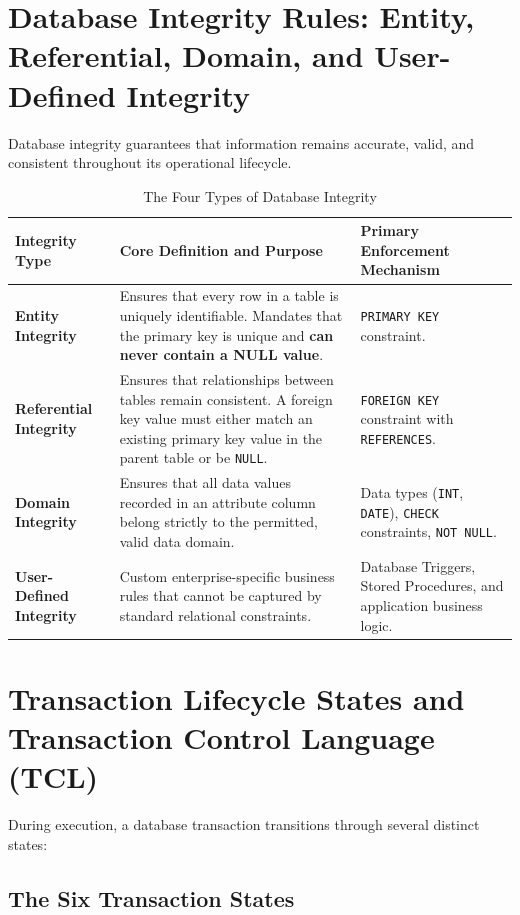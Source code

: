 \newpage
\section{Database Integrity Rules: Entity, Referential, Domain, and User-Defined Integrity}

Database integrity guarantees that information remains accurate, valid, and consistent throughout its operational lifecycle.

\begin{table}[htbp]
\centering
\caption{The Four Types of Database Integrity}
\label{tab:database_integrity_types}
\begin{tabularx}{\textwidth}{p{3.2cm} X X}
\toprule
\textbf{Integrity Type} & \textbf{Core Definition and Purpose} & \textbf{Primary Enforcement Mechanism} \\
\midrule
\textbf{Entity Integrity} & Ensures that every row in a table is uniquely identifiable. Mandates that the primary key is unique and \textbf{can never contain a NULL value}. & \texttt{PRIMARY KEY} constraint. \\
\textbf{Referential Integrity} & Ensures that relationships between tables remain consistent. A foreign key value must either match an existing primary key value in the parent table or be \texttt{NULL}. & \texttt{FOREIGN KEY} constraint with \texttt{REFERENCES}. \\
\textbf{Domain Integrity} & Ensures that all data values recorded in an attribute column belong strictly to the permitted, valid data domain. & Data types (\texttt{INT}, \texttt{DATE}), \texttt{CHECK} constraints, \texttt{NOT NULL}. \\
\textbf{User-Defined Integrity} & Custom enterprise-specific business rules that cannot be captured by standard relational constraints. & Database Triggers, Stored Procedures, and application business logic. \\
\bottomrule
\end{tabularx}
\end{table}

\newpage
\section{Transaction Lifecycle States and Transaction Control Language (TCL)}

During execution, a database transaction transitions through several distinct states:

\subsection{The Six Transaction States}

